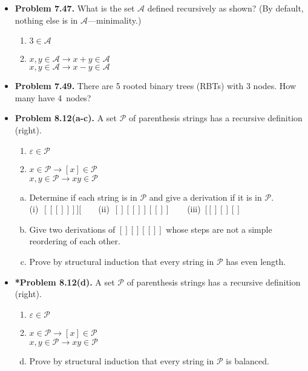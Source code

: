 \documentclass[11pt]{article}
\def\imp{\rightarrow}
\begin{document}
\begin{itemize}
\vspace{0.1in}

\item \textbf{Problem 7.47.}
What is the set $\mathcal{A}$ defined recursively as shown?
(By default, nothing else is in $\mathcal{A}$---minimality.)
\begin{enumerate}[(1)]
\item $3\in\mathcal{A}$
\item $x,y\in\mathcal{A}\imp x+y\in\mathcal{A}$ \\
  $x,y\in\mathcal{A}\imp x-y\in\mathcal{A}$
\end{enumerate}

\vspace{0.1in}

\item \textbf{Problem 7.49.}
There are 5 rooted binary trees (RBTs) with 3 nodes.
How many have 4~nodes?

\vspace{0.1in}

\item \textbf{Problem 8.12(a-c).}
A set $\mathcal{P}$ of parenthesis strings has a recursive definition (right).
\begin{enumerate}[(1)]
\item $\varepsilon\in\mathcal{P}$
\item $x\in\mathcal{P}\imp [x]\in\mathcal{P}$ \\
  $x,y\in\mathcal{P}\imp xy\in\mathcal{P}$
\end{enumerate}
\begin{enumerate}[(a)]
\item Determine if each string is in $\mathcal{P}$ and
  give a derivation if it is in $\mathcal{P}$. \\
  (i)~$[[[]]]][$\ \ \ \ (ii)~$[][[]][[]]$\ \ \ \ (iii)~$[[][][]$
\item Give two derivations of $[][][[]]$ whose steps are not a simple reordering of each other.
\item Prove by structural induction that every string in $\mathcal{P}$ has even length.
\end{enumerate}

\vspace{0.1in}

\item \textbf{*Problem 8.12(d).}
A set $\mathcal{P}$ of parenthesis strings has a recursive definition (right).
\begin{enumerate}[(1)]
\item $\varepsilon\in\mathcal{P}$
\item $x\in\mathcal{P}\imp [x]\in\mathcal{P}$ \\
  $x,y\in\mathcal{P}\imp xy\in\mathcal{P}$
\end{enumerate}
\begin{enumerate}[(a)]
\setcounter{enumi}{3}
\item Prove by structural induction that every string in $\mathcal{P}$ is balanced.
\end{enumerate}


\end{itemize}
\end{document}
